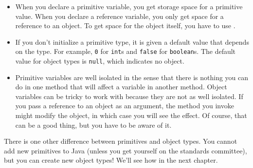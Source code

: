 \begin{itemize}

\item When you declare a primitive variable, you get storage space for a primitive value.
When you declare a reference variable, you only get space for a reference to an object.
To get space for the object itself, you have to use .

\item If you don't initialize a primitive type, it is given a default value that depends on the type.
For example, {\tt 0} for {\tt int}s and {\tt false} for {\tt boolean}s.
The default value for object types is {\tt null}, which indicates no object.

\item Primitive variables are well isolated in the sense that there is nothing you can do in one method that will affect a variable in another method.
Object variables can be tricky to work with because they are not as well isolated.
If you pass a reference to an object as an argument, the method you invoke might modify the object, in which case you will see the effect.
Of course, that can be a good thing, but you have to be aware of it.

\end{itemize}

There is one other difference between primitives and object types.
You cannot add new primitives to Java (unless you get yourself on the standards committee), but you can create new object types!  We'll see how in the next chapter.



